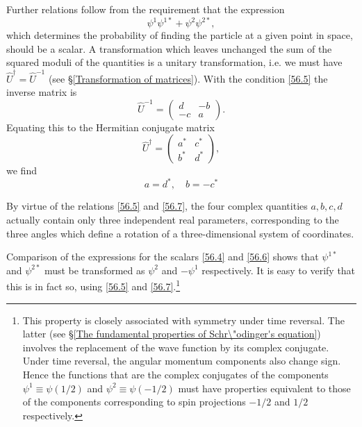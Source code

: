 Further relations follow from the requirement that the expression
\begin{equation}\label{56.6}
\psi^1\psi^{1*}+\psi^2\psi^{2*},
\end{equation}
which determines the probability of finding the particle at a given point in space, should be a scalar. A transformation which leaves unchanged the sum of the squared moduli of the quantities is a unitary transformation, i.e. we must have $ \hat{U}^\dagger=\hat{U}^{-1} $ (see \S\ref{Transformation of matrices}). With the condition \eqref{56.5} the inverse matrix is
\[ \hat{U}^{-1}=\left(\begin{array}{cc}
d&-b\\
-c&a
\end{array}\right). \]
Equating this to the Hermitian conjugate matrix
\[ \hat{U}^\dagger=\left(\begin{array}{cc}
a^*&c^*\\
b^*&d^*
\end{array}\right), \]
we find
\begin{equation}\label{56.7}
a=d^*,\quad b=-c^*
\end{equation}


By virtue of the relations \eqref{56.5} and \eqref{56.7}, the four complex quantities $ a, b, c, d $ actually contain only three independent real parameters, corresponding to the three angles which define a rotation of a three-dimensional system of coordinates.

Comparison of the expressions for the scalars \eqref{56.4} and \eqref{56.6} shows that $\psi^{1*}$ and $\psi^{2*}$ must be transformed as $\psi^2$ and $ -\psi^1 $ respectively. It is easy to verify that this is in fact so, using \eqref{56.5} and \eqref{56.7}.\footnote{This property is closely associated with symmetry under time reversal. The latter (see \S\ref{The fundamental properties of Schr\"odinger's equation}) involves the replacement of the wave function by its complex conjugate. Under time reversal, the angular momentum components also change sign. Hence the functions that are the complex conjugates of the components $ \psi^1 \equiv \psi(1/2) $ and $ \psi^2 \equiv \psi(-1/2) $ must have properties equivalent to those of the components corresponding to spin projections $ -1/2 $ and $ 1/2 $ respectively.
}

